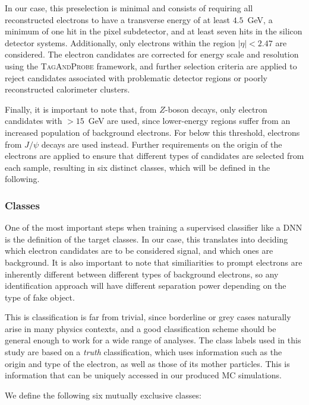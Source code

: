 In our case, this preselection is minimal and consists of requiring all reconstructed electrons to have a transverse energy of at least $4.5$~GeV, a minimum of one hit in the pixel subdetector, and at least seven hits in the silicon detector systems. Additionally, only electrons within the region $|\eta| < 2.47$ are considered. The electron candidates are corrected for energy scale and resolution using the \textsc{TagAndProbe} framework, and further selection criteria are applied to reject candidates associated with problematic detector regions or poorly reconstructed calorimeter clusters.

Finally, it is important to note that, from $Z$-boson decays, only electron candidates with \et$>15$~GeV are used, since lower-energy regions suffer from an increased population of background electrons. For \et below this threshold, electrons from $J/\psi$ decays are used instead. Further requirements on the origin of the electrons are applied to ensure that different types of candidates are selected from each sample, resulting in six distinct classes, which will be defined in the following.

\subsubsection{Classes}

One of the most important steps when training a supervised classifier like a DNN is the definition of the target classes. In our case, this translates into deciding which electron candidates are to be considered signal, and which ones are background. It is also important to note that similiarities to prompt electrons are inherently different between different types of background electrons, so any identification approach will have different separation power depending on the type of fake object. 

This is classification is far from trivial, since borderline or grey cases naturally arise in many physics contexts, and a good classification scheme should be general enough to work for a wide range of analyses.
The class labels used in this study are based on a \textit{truth} classification, which uses information such as the origin and type of the electron, as well as those of its mother particles. This is information that can be uniquely accessed in our produced MC simulations.

We define the following six mutually exclusive classes:

